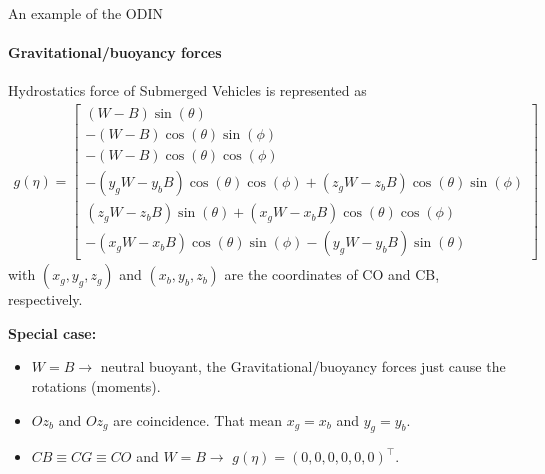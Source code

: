 \begin{frame}{An example of the ODIN}
	\framesubtitle{Gravitational/buoyancy forces}
	Hydrostatics force of Submerged Vehicles is represented as
	\begin{align}
		g(\eta) =
		\begin{bmatrix}
			(W - B) \sin(\theta) \\
			- (W - B) \cos(\theta) \sin(\phi) \\
			- (W - B) \cos(\theta) \cos(\phi) \\
			- (y_g W - y_b B) \cos(\theta) \cos(\phi) + (z_g W - z_b B) \cos(\theta) \sin(\phi) \\
			(z_g W - z_b B) \sin(\theta) + (x_g W - x_b B) \cos(\theta) \cos(\phi) \\
			- (x_g W - x_b B) \cos(\theta) \sin(\phi) - (y_g W - y_b B) \sin(\theta)
		\end{bmatrix}
	\end{align}
	with $(x_g, y_g, z_g)$ and $(x_b, y_b, z_b)$ are the coordinates of CO and CB, respectively.
	
	\textbf{Special case:} 
	\begin{itemize}
		\item $W = B \to$ neutral buoyant, the Gravitational/buoyancy forces just cause the rotations (moments).
		\item $Oz_b$ and $Oz_g$ are coincidence. That mean $x_g = x_b$ and $y_g = y_b$. 
		\item  $CB \equiv CG \equiv CO$ and $W = B \to$ $g(\eta) = (0, 0, 0, 0, 0, 0)^\top$.
	\end{itemize}
\end{frame}







